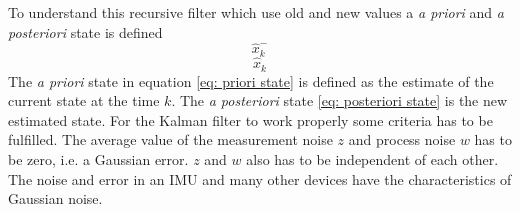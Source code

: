 \documentclass[a4paper,11pt]{kth-mag}
\begin{document}
To understand this recursive filter which use old and new values a \textit{a priori} and \textit{a posteriori} state is defined
\begin{equation} \label{eq: priori state}
\hat{x}^-_k
\end{equation}
\begin{equation} \label{eq: posteriori state}
\hat{x}_k
\end{equation}
The \textit{a priori}  state in equation \eqref{eq: priori state} is defined as the estimate of the current state at the time $k$. The \textit{a posteriori} state \eqref{eq: posteriori state} is the new estimated state.
For the Kalman filter to work properly some criteria has to be fulfilled. The average value of the measurement noise $z$ and process noise $w$ has to be zero, i.e. a Gaussian error. $z$ and $w$ also has to be independent of  each other. The noise and error in an IMU and many other devices have the characteristics of Gaussian noise.
\end{document}
